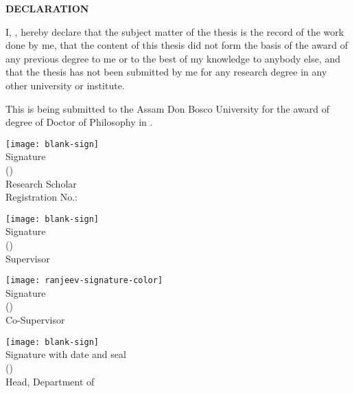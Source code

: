 \begin{titlepage}
    \begin{center}
        {\bf \LARGE DECLARATION}
    \end{center}

    \par
    I, \textit{\authorname}, hereby declare that the subject matter of the thesis is the record of the work done by me, that the content of this thesis did not form the basis of the award of any previous degree to me or to the best of my knowledge to anybody else, and that the thesis has not been submitted by me for any research degree in any other university or institute.
    
    \par
    This is being submitted to the Assam Don Bosco University for the award of degree of Doctor of Philosophy in \department.
    
    \vspace*{10mm}
    \begin{flushleft}
    	\texttt{[image: blank-sign]}\vspace{-3mm}\\
        Signature\\
        (\authorname)\\
        Research Scholar\\
        Registration No.: \textit{\registrationNo}
    \end{flushleft}
    
    \vspace*{5mm}
    \begin{minipage}{0.3\textwidth}
    	\texttt{[image: blank-sign]}\vspace{-3mm}\\
    	Signature\\
		(\supervisor)\\
		Supervisor
    \end{minipage}
    \hfill
    \begin{minipage}{0.3\textwidth}
    	\texttt{[image: ranjeev-signature-color]}\vspace{-3mm}\\
		Signature\\
		(\cosupervisor)\\
		Co-Supervisor
    \end{minipage}
        
    \vspace*{5mm}
    \begin{flushleft}
    	\texttt{[image: blank-sign]}\vspace{-3mm}\\
        Signature with date and seal\\
        (\headofdepartment)\\
        Head, Department of \department
    \end{flushleft}

\end{titlepage}
